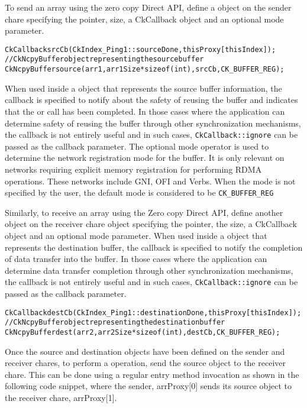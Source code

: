 \vspace{0.1in}
\noindent
To send an array using the zero copy Direct API, define a 
object on the sender chare specifying the pointer, size, a CkCallback
object and an optional mode parameter.

\begin{alltt}
CkCallback srcCb(CkIndex_Ping1::sourceDone, thisProxy[thisIndex]);
// CkNcpyBuffer object representing the source buffer
CkNcpyBuffer source(arr1, arr1Size * sizeof(int), srcCb, CK_BUFFER_REG);
\end{alltt}

When used inside a  object that represents the source buffer
information, the callback is specified to notify about the safety of
reusing the buffer and indicates that the  or 
call has been completed. In those cases where the application can determine
safety of reusing the buffer through other synchronization mechanisms, the
callback is not entirely useful and in such cases, \texttt{CkCallback::ignore}
can be passed as the callback parameter. The optional mode operator is used to
determine the network registration mode for the buffer. It is only relevant
on networks requiring explicit memory registration for performing RDMA operations.
These networks include GNI, OFI and Verbs. When the mode is not specified by
the user, the default mode is considered to be {\tt CK\_BUFFER\_REG}

Similarly, to receive an array using the Zero copy Direct API, define another
 object on the receiver chare object specifying the
pointer, the size, a CkCallback object and an optional mode parameter.
When used inside a  object that represents the destination
buffer, the callback is specified to notify the completion of data transfer
into the  buffer.
In those cases where the application can determine data transfer completion
through other synchronization mechanisms, the callback is not entirely useful
and in such cases, \texttt{CkCallback::ignore} can be passed as the callback
parameter.

\begin{alltt}
CkCallback destCb(CkIndex_Ping1::destinationDone, thisProxy[thisIndex]);
// CkNcpyBuffer object representing the destination buffer
CkNcpyBuffer dest(arr2, arr2Size * sizeof(int), destCb, CK_BUFFER_REG);
\end{alltt}

Once the source  and destination  objects have
been defined on the sender and receiver chares, to perform a  operation, send
the source  object to the receiver chare. This can be done using a
regular entry method invocation as shown in the following code snippet,
where the sender, arrProxy[0] sends its source object to the receiver chare, arrProxy[1].

